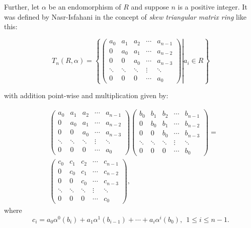 \documentclass[12pt]{amsart}
\theoremstyle{definition}
\begin{document}
Further, let $\alpha$ be an endomorphism of $R$ and suppose $n$ is a positive integer. It was defined by Nasr-Isfahani in \cite{nasr} the concept of {\it skew triangular matrix ring} like this:

$$T_{n}(R,\alpha )=\left\{ \left. \begin{pmatrix}
	a_{0} & a_{1} & a_{2} & \cdots & a_{n-1} \\
	0 & a_{0} & a_{1} & \cdots & a_{n-2} \\
	0 & 0 & a_{0} & \cdots & a_{n-3} \\
	\ddots & \ddots & \ddots & \vdots & \ddots \\
	0 & 0 & 0 & \cdots & a_{0}
\end{pmatrix} \right| a_{i}\in R \right\}$$

\medskip

\noindent with addition point-wise and multiplication given by:

\medskip

\begin{align*}
	&\begin{pmatrix}
		a_{0} & a_{1} & a_{2} & \cdots & a_{n-1} \\
		0 & a_{0} & a_{1} & \cdots & a_{n-2} \\
		0 & 0 & a_{0} & \cdots & a_{n-3} \\
		\ddots & \ddots & \ddots & \vdots & \ddots \\
		0 & 0 & 0 & \cdots & a_{0}
	\end{pmatrix}\begin{pmatrix}
		b_{0} & b_{1} & b_{2} & \cdots & b_{n-1} \\
		0 & b_{0} & b_{1} & \cdots & b_{n-2} \\
		0 & 0 & b_{0} & \cdots & b_{n-3} \\
		\ddots & \ddots & \ddots & \vdots & \ddots \\
		0 & 0 & 0 & \cdots & b_{0}
	\end{pmatrix}  =\\
	& \begin{pmatrix}
		c_{0} & c_{1} & c_{2} & \cdots & c_{n-1} \\
		0 & c_{0} & c_{1} & \cdots & c_{n-2} \\
		0 & 0 & c_{0} & \cdots & c_{n-3} \\
		\ddots & \ddots & \ddots & \vdots & \ddots \\
		0 & 0 & 0 & \cdots & c_{0}
	\end{pmatrix},
\end{align*}
where $$c_{i}=a_{0}\alpha^{0}(b_{i})+a_{1}\alpha^{1}(b_{i-1})+\cdots +a_{i}\alpha^{i}(b_{0}),~~ 1\leq i\leq n-1
.$$
\end{document}
